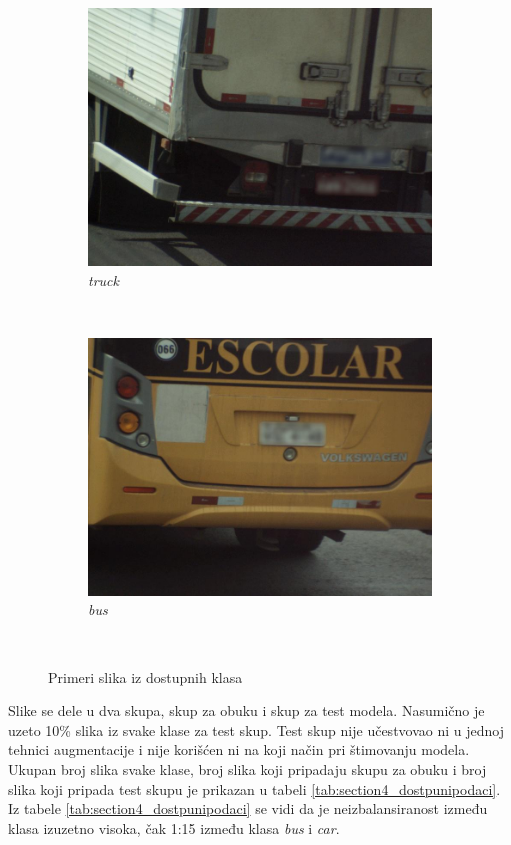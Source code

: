 \documentclass[12pt,oneside]{memoir}
\begin{document}
\begin{figure}
\begin{subfigure}[b]{0.48\textwidth}
        \includegraphics[width=\textwidth]{matfmaster/glava3/truck.jpg}
        \caption{\textit{truck}}
        \label{fig:section3_truck}
    \end{subfigure}
    ~
    \begin{subfigure}[b]{0.48\textwidth}
        \includegraphics[width=\textwidth]{matfmaster/glava3/bus.jpg}
        \caption{\textit{bus}}
        \label{fig:section3_bus}
    \end{subfigure}
    ~
    \caption{Primeri slika iz dostupnih klasa}\label{fig:section3_allclasses}
\end{figure}


\clearpage
Slike se dele u dva skupa, skup za obuku i skup za test modela. Nasumično je uzeto 10\% slika iz svake klase za test skup. Test skup nije učestvovao ni u jednoj tehnici augmentacije i nije korišćen ni na koji način pri štimovanju modela. Ukupan broj slika svake klase, broj slika koji pripadaju skupu za obuku i broj slika koji pripada test skupu je prikazan u tabeli \ref{tab:section4_dostpunipodaci}. Iz tabele \ref{tab:section4_dostpunipodaci} se vidi da je neizbalansiranost između klasa izuzetno visoka, čak 1:15 između klasa \textit{bus} i \textit{car}.
\end{document}
